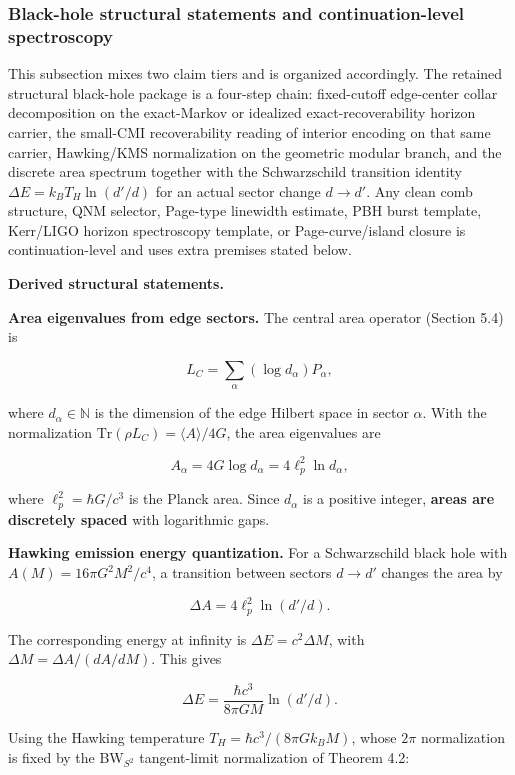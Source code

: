 \subsubsection{Black-hole structural statements and continuation-level spectroscopy}\label{511-discrete-horizon-area-spectrum-and-hawking-emission-established}

This subsection mixes two claim tiers and is organized accordingly. The retained structural
black-hole package is a four-step chain: fixed-cutoff edge-center collar decomposition on the
exact-Markov or idealized exact-recoverability horizon carrier, the small-CMI recoverability
reading of interior encoding on that same carrier, Hawking/KMS normalization on the geometric
modular branch, and the discrete area spectrum together with the Schwarzschild transition identity
\(\Delta E = k_B T_H \ln(d'/d)\) for an actual sector change \(d \to d'\). Any clean comb
structure, QNM selector, Page-type linewidth estimate, PBH burst template, Kerr/LIGO horizon
spectroscopy template, or Page-curve/island closure is continuation-level and uses extra
premises stated below.

\textbf{Derived structural statements.}

\textbf{Area eigenvalues from edge sectors.} The central area operator (Section 5.4) is

\[
L_C = \sum_\alpha (\log d_\alpha) P_\alpha,
\]

where \(d_\alpha \in \mathbb{N}\) is the dimension of the edge Hilbert space in sector \(\alpha\). With the normalization \(\mathrm{Tr}(\rho L_C) = \langle A
\rangle / 4G\), the area eigenvalues are

\[
A_\alpha = 4G \log d_\alpha = 4\ell_p^2 \ln d_\alpha,
\]

where \(\ell_p^2 = \hbar G/c^3\) is the Planck area. Since \(d_\alpha\) is a positive integer, \textbf{areas are discretely spaced} with logarithmic gaps.

\textbf{Hawking emission energy quantization.} For a Schwarzschild black hole with \(A(M) = 16\pi G^2 M^2/c^4\), a transition between sectors \(d \to d'\) changes the area by

\[
\Delta A = 4\ell_p^2 \ln(d'/d).
\]

The corresponding energy at infinity is \(\Delta E = c^2 \Delta M\), with \(\Delta M = \Delta A / (dA/dM)\). This gives

\[
\Delta E = \frac{\hbar c^3}{8\pi G M} \ln(d'/d).
\]

Using the Hawking temperature \(T_H = \hbar c^3 / (8\pi G k_B M)\), whose \(2\pi\) normalization is fixed by the BW\(_{S^2}\) tangent-limit normalization of Theorem 4.2:


